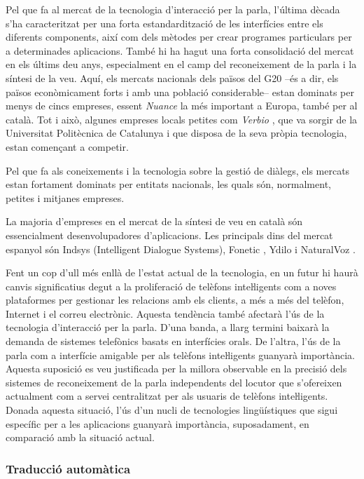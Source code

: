 \begin{multicols}{2}
Pel que fa al mercat de la tecnologia d’interacció per la parla, l’última dècada s’ha caracteritzat per una forta estandardització de les interfícies entre els diferents components, així com dels mètodes per crear programes particulars per a determinades aplicacions. També hi ha hagut una forta consolidació del mercat en els últims deu anys, especialment en el camp del reconeixement de la parla i la síntesi de la veu. Aquí, els mercats nacionals dels països del G20 –és a dir, els països econòmicament forts i amb una població considerable– estan dominats per menys de cincs empreses, essent \textit{Nuance} la més important a Europa, també per al català. Tot i això, algunes empreses locals petites com \textit{Verbio} \cite{CAT-Nota25}, que va sorgir de la Universitat Politècnica de Catalunya i que disposa de la seva pròpia tecnologia, estan començant a competir.

Pel que fa als coneixements i la tecnologia sobre la gestió de diàlegs, els mercats estan fortament dominats per entitats nacionals, les quals són, normalment, petites i mitjanes empreses. 

La majoria d’empreses en el mercat de la síntesi de veu en català són essencialment desenvolupadores d’aplicacions. Les principals dins del mercat espanyol són Indsys \cite{CAT-Nota26} (Intelligent Dialogue Systems), Fonetic \cite{CAT-Nota27}, Ydilo \cite{CAT-Nota28} i NaturalVoz \cite{CAT-Nota29}.

Fent un cop d’ull més enllà de l’estat actual de la tecnologia, en un futur hi haurà canvis significatius degut a la proliferació de telèfons inteŀligents com a noves plataformes per gestionar les relacions amb els clients, a més a més del telèfon, Internet i el correu electrònic. Aquesta tendència també afectarà l’ús de la tecnologia d’interacció per la parla. D’una banda, a llarg termini baixarà la demanda de sistemes telefònics basats en interfícies orals. De l’altra, l’ús de la parla com a interfície amigable per als telèfons inteŀligents guanyarà importància. Aquesta suposició es veu justificada per la millora observable en la precisió dels sistemes de reconeixement de la parla independents del locutor que s’ofereixen actualment com a servei centralitzat per als usuaris de telèfons inteŀligents. Donada aquesta situació, l’ús d’un nucli de tecnologies lingüístiques que sigui específic per a les aplicacions guanyarà importància, suposadament, en comparació amb la situació actual. 

\subsubsection{Traducció automàtica}


\end{multicols}
